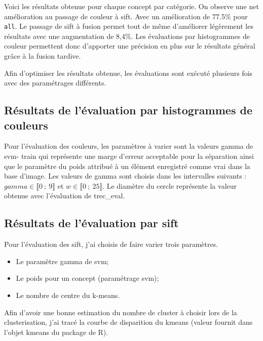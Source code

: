 \documentclass[a4paper, 11pt]{article}
\begin{document}
Voici les résultats obtenue pour chaque concept par catégorie. On observe une net amélioration au passage de couleur à sift. Avec un amélioration de 77.5\% pour \texttt{all}. Le passage de sift à fusion permet tout de même d'améliorer légèrement les résultats avec une augmentation de 8,4\%. Les évaluations par histogrammes de couleur permettent donc d'apporter une précision en plus sur le résultats général grâce à la fusion tardive.

Afin d'optimiser les résultats obtenue, les évaluations sont exécuté plusieurs fois avec des paramétrages différents.

\subsection{Résultats de l'évaluation par histogrammes de couleurs}
\begin{center}
\end{center}

Pour l'évaluation des couleurs, les paramètres à varier sont la valeurs gamma de svm-
train qui représente une marge d'erreur acceptable pour la séparation ainsi que le paramètre du poids attribué à un élément enregistré comme vrai dans la base d'image. Les valeurs de gamma sont choisis dans les intervalles suivants : $gamma \in \llbracket  0~;~9 \rrbracket$ et $w \in \llbracket  0~;~25 \rrbracket$.
Le diamètre du cercle représente la valeur obtenue avec l'évaluation de trec\_eval.

\subsection{Résultats de l'évaluation par sift}
Pour l'évaluation des sift, j'ai choisis de faire varier trois paramètres.
\begin{itemize}
	\item Le paramètre gamma de svm;
	\item Le poids pour un concept (paramétrage svm);
	\item Le nombre de centre du k-means.
\end{itemize}
Afin d'avoir une bonne estimation du nombre de cluster à choisir lors de la clusterisation, j'ai tracé la courbe de disparition du kmeans (valeur fournit dans l'objet kmeans du package de R).
\end{document}
